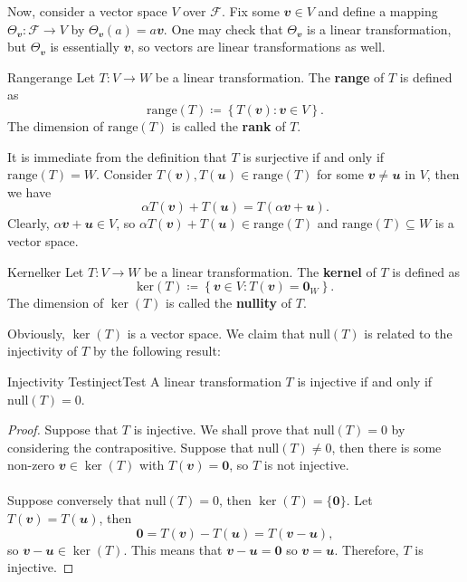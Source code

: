 \documentclass[math, code]{amznotes}
\theoremstyle{remark}
\newcommand{\zero}{\mathbf{0}}
\begin{document}
Now, consider a vector space $V$ over $\mathcal{F}$. Fix some $\mathbfit{v} \in V$ and define a mapping $\Theta_{\mathbfit{v}} \colon \mathcal{F} \to V$ by $\Theta_{\mathbfit{v}}(a) = a\mathbfit{v}$. One may check that $\Theta_{\mathbfit{v}}$ is a linear transformation, but $\Theta_{\mathbfit{v}}$ is essentially $\mathbfit{v}$, so vectors are linear transformations as well.
\begin{dfnbox}{Range}{range}
    Let $T \colon V \to W$ be a linear transformation. The {\color{red} \textbf{range}} of $T$ is defined as
    \begin{equation*}
        \mathrm{range}(T) \coloneqq \left\{T(\mathbfit{v}) \colon \mathbfit{v} \in V\right\}.
    \end{equation*}
    The dimension of $\mathrm{range}(T)$ is called the {\color{red} \textbf{rank}} of $T$.
\end{dfnbox}
It is immediate from the definition that $T$ is surjective if and only if $\mathrm{range}(T) = W$. Consider $T(\mathbfit{v}), T(\mathbfit{u}) \in \mathrm{range}(T)$ for some $\mathbfit{v} \neq \mathbfit{u}$ in $V$, then we have
\begin{equation*}
    \alpha T(\mathbfit{v}) + T(\mathbfit{u}) = T(\alpha\mathbfit{v} + \mathbfit{u}).
\end{equation*}
Clearly, $\alpha\mathbfit{v} + \mathbfit{u} \in V$, so $\alpha T(\mathbfit{v}) + T(\mathbfit{u}) \in \mathrm{range}(T)$ and $\mathrm{range}(T) \subseteq W$ is a vector space.
\begin{dfnbox}{Kernel}{ker}
    Let $T \colon V \to W$ be a linear transformation. The {\color{red} \textbf{kernel}} of $T$ is defined as 
    \begin{equation*}
        \mathrm{ker}(T) \coloneqq \left\{\mathbfit{v} \in V \colon T(\mathbfit{v}) = \zero_{W}\right\}.
    \end{equation*}
    The dimension of $\ker(T)$ is called the {\color{red} \textbf{nullity}} of $T$.
\end{dfnbox}
Obviously, $\ker(T)$ is a vector space. We claim that $\mathrm{null}(T)$ is related to the injectivity of $T$ by the following result:
\begin{probox}{Injectivity Test}{injectTest}
    A linear transformation $T$ is injective if and only if $\mathrm{null}(T) = 0$.
    \tcblower
    \begin{proof}
        Suppose that $T$ is injective. We shall prove that $\mathrm{null}(T) = 0$ by considering the contrapositive. Suppose that $\mathrm{null}(T) \neq 0$, then there is some non-zero $\mathbfit{v} \in \ker(T)$ with $T(\mathbfit{v}) = \zero$, so $T$ is not injective.
        \\\\
        Suppose conversely that $\mathrm{null}(T) = 0$, then $\ker(T) = \{\zero\}$. Let $T(\mathbfit{v}) = T(\mathbfit{u})$, then
        \begin{equation*}
            \zero = T(\mathbfit{v}) - T(\mathbfit{u}) = T(\mathbfit{v - u}),
        \end{equation*}
        so $\mathbfit{v - u} \in \ker(T)$. This means that $\mathbfit{v - u} = \zero$ so $\mathbfit{v = u}$. Therefore, $T$ is injective.
    \end{proof}
\end{probox}
\end{document}

